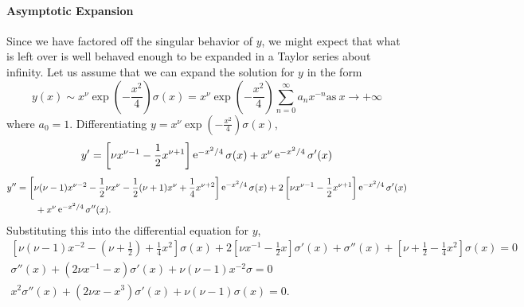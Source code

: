 \paragraph{Asymptotic Expansion}
Since we have factored off the singular behavior of $y$, we might expect that
what is left over is well behaved enough to be expanded in a Taylor series
about infinity. 
Let us assume that we can expand the solution for $y$ in the form
\[ y(x) \sim x^\nu \exp\left(-\frac{x^2}{4} \right) \sigma(x) = 
x^\nu \exp\left(-\frac{x^2}{4}\right) \sum_{n=0}^\infty a_n x^{-n}
\mathrm{as}\ x \to +\infty\]
where $a_0 = 1$.
Differentiating $y = x^\nu \exp\left(-\frac{x^2}{4} \right)\sigma(x)$,
\[ y' = \left[\nu x^{\nu-1} - \frac{1}{2} x^{\nu+1}\right]\mathop{\mathrm{e}}\nolimits^{-x^2/4} \sigma(x) 
+ x^\nu \mathop{\mathrm{e}}\nolimits^{-x^2/4} \sigma'(x) \]
\begin{align*} 
  y'' &= \left[\nu(\nu-1)x^{\nu-2} - \frac{1}{2}\nu x^\nu 
    - \frac{1}{2}(\nu+1)x^\nu
    +\frac{1}{4}x^{\nu+2}\right]\mathop{\mathrm{e}}\nolimits^{-x^2/4}\sigma(x) + 
  2\left[\nu x^{\nu-1} - \frac{1}{2} x^{\nu+1}\right]
  \mathop{\mathrm{e}}\nolimits^{-x^2/4} \sigma'(x) \\
  &\qquad + x^\nu \mathop{\mathrm{e}}\nolimits^{-x^2/4} \sigma''(x).
\end{align*}
Substituting this into the differential equation for $y$,
\begin{gather*}
  \left[\nu(\nu-1)x^{-2} - (\nu+\frac{1}{2}) + \frac{1}{4} x^2\right]\sigma(x) + 
  2\left[\nu x^{-1} - \frac{1}{2} x\right]\sigma'(x) + \sigma''(x) + 
  \left[\nu + \frac{1}{2} - \frac{1}{4} x^2\right]\sigma(x) = 0 \\
  \sigma''(x) + (2\nu x^{-1} - x)\sigma'(x) + \nu(\nu-1) x^{-2} \sigma = 0 \\
  x^2 \sigma''(x) + (2\nu x - x^3)\sigma'(x) + \nu(\nu-1)\sigma(x) = 0.
\end{gather*}







